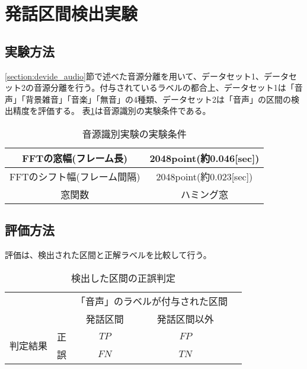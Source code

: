 \section{発話区間検出実験}
\subsection{実験方法}
\ref{section:devide_audio}節で述べた音源分離を用いて、データセット1、データセット2の音源分離を行う。付与されているラベルの都合上、データセット1は「音声」「背景雑音」「音楽」「無音」の4種類、データセット2は「音声」の区間の検出精度を評価する。
表\ref{table:detail_identification_method}は音源識別の実験条件である。

\begin{table}[H]
  \begin{center}
    \caption{音源識別実験の実験条件 \label{table:detail_identification_method}}
    \begin{tabular}{|c||c|} \hline
      FFTの窓幅(フレーム長) & 2048point(約0.046[sec])   \\ \hline
      FFTのシフト幅(フレーム間隔) &  2048point(約0.023[sec]) \\ \hline
      窓関数 & ハミング窓  \\ \hline
    \end{tabular}
  \end{center}
\end{table}

\subsection{評価方法}
評価は、検出された区間と正解ラベルを比較して行う。

\begin{table}[H]
\begin{center}
    \caption{検出した区間の正誤判定 \label{table:search_table}}
\begin{tabular}{|c|c|c|c|l}
\cline{1-4}
\multicolumn{2}{|c|}{\multirow{2}{*}{}} & \multicolumn{2}{c|}{「音声」のラベルが付与された区間} &  \\ \cline{3-4}
\multicolumn{2}{|c|}{}                  & 発話区間        & 発話区間以外        &  \\ \cline{1-4}
\multirow{2}{*}{判定結果}        & 正        & $TP$                  & $FP$                   &  \\ \cline{2-4}
& 誤        & $FN$                  & $TN$                   &  \\ \cline{1-4}
\end{tabular}
\end{center}
\end{table}

